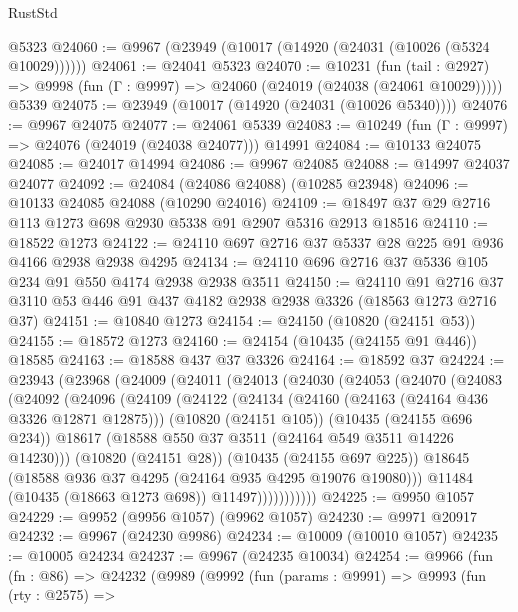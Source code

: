 \begin{lexlean}{RustStd}
\begin{coremodule}
    @5323
@24060 := @9967 (@23949 (@10017 (@14920 (@24031 (@10026 (@5324 @10029))))))
@24061 := @24041 @5323
@24070 := @10231
    (fun (tail : @2927) => @9998 (fun (Γ : @9997) => @24060 (@24019 (@24038 (@24061 @10029)))))
    @5339
@24075 := @23949 (@10017 (@14920 (@24031 (@10026 @5340))))
@24076 := @9967 @24075
@24077 := @24061 @5339
@24083 := @10249 (fun (Γ : @9997) => @24076 (@24019 (@24038 @24077))) @14991
@24084 := @10133 @24075
@24085 := @24017 @14994
@24086 := @9967 @24085
@24088 := @14997 @24037 @24077
@24092 := @24084 (@24086 @24088) (@10285 @23948)
@24096 := @10133 @24085 @24088 (@10290 @24016)
@24109 := @18497 @37 @29 @2716 @113 @1273 @698 @2930 @5338 @91 @2907 @5316 @2913 @18516
@24110 := @18522 @1273
@24122 := @24110 @697 @2716 @37 @5337 @28 @225 @91 @936 @4166 @2938 @2938 @4295
@24134 := @24110 @696 @2716 @37 @5336 @105 @234 @91 @550 @4174 @2938 @2938 @3511
@24150 := @24110
    @91
    @2716
    @37
    @3110
    @53
    @446
    @91
    @437
    @4182
    @2938
    @2938
    @3326
    (@18563 @1273 @2716 @37)
@24151 := @10840 @1273
@24154 := @24150 (@10820 (@24151 @53))
@24155 := @18572 @1273
@24160 := @24154 (@10435 (@24155 @91 @446)) @18585
@24163 := @18588 @437 @37 @3326
@24164 := @18592 @37
@24224 := @23943
    (@23968
      (@24009
        (@24011
          (@24013
            (@24030
              (@24053
                (@24070
                  (@24083
                    (@24092
                      (@24096
                        (@24109
                          (@24122
                            (@24134
                              (@24160 (@24163 (@24164 @436 @3326 @12871 @12875)))
                              (@10820 (@24151 @105))
                              (@10435 (@24155 @696 @234))
                              @18617
                              (@18588 @550 @37 @3511 (@24164 @549 @3511 @14226 @14230)))
                            (@10820 (@24151 @28))
                            (@10435 (@24155 @697 @225))
                            @18645
                            (@18588 @936 @37 @4295 (@24164 @935 @4295 @19076 @19080)))
                          @11484
                          (@10435 (@18663 @1273 @698))
                          @11497)))))))))))
@24225 := @9950 @1057
@24229 := @9952 (@9956 @1057) (@9962 @1057)
@24230 := @9971 @20917
@24232 := @9967 (@24230 @9986)
@24234 := @10009 (@10010 @1057)
@24235 := @10005 @24234
@24237 := @9967 (@24235 @10034)
@24254 := @9966
    (fun (fn : @86) =>
    @24232
      (@9989
        (@9992
          (fun (params : @9991) =>
          @9993
            (fun (rty : @2575) =>

\end{coremodule}
\end{lexlean}

